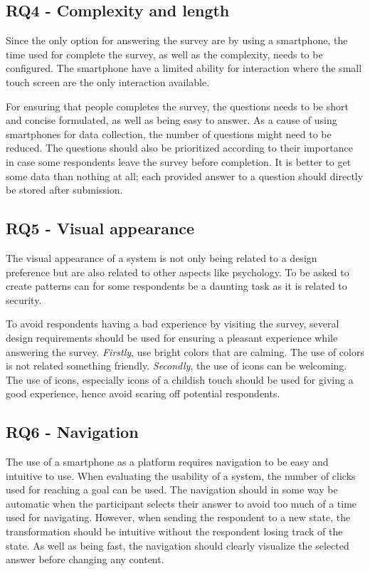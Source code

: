     \subsection*{RQ4 - Complexity and length}
    Since the only option for answering the survey are by using a smartphone, the time used for complete the survey, as well as the complexity, needs to be configured. The smartphone have a limited ability for interaction where the small touch screen are the only interaction available. 

    For ensuring that people completes the survey, the questions needs to be short and concise formulated, as well as being easy to answer. As a cause of using smartphones for data collection, the number of questions might need to be reduced. The questions should also be prioritized according to their importance in case some respondents leave the survey before completion. It is better to get some data than nothing at all; each provided answer to a question should directly be stored after submission. 

    \subsection*{RQ5 - Visual appearance}
    The visual appearance of a system is not only being related to a design preference but are also related to other aspects like psychology. To be asked to create patterns can for some respondents be a daunting task as it is related to security. 

    To avoid respondents having a bad experience by visiting the survey, several design requirements should be used for ensuring a pleasant experience while answering the survey. {\it Firstly}, use bright colors that are calming. The use of colors is not related something friendly. {\it Secondly}, the use of icons can be welcoming. The use of icons, especially icons of a childish touch should be used for giving a good experience, hence avoid scaring off potential respondents. 

    \subsection*{RQ6 - Navigation}
    The use of a smartphone as a platform requires navigation to be easy and intuitive to use. When evaluating the usability of a system, the number of clicks used for reaching a goal can be used. The navigation should in some way be automatic when the participant selects their answer to avoid too much of a time used for navigating. However, when sending the respondent to a new state, the transformation should be intuitive without the respondent losing track of the state. As well as being fast, the navigation should clearly visualize the selected answer before changing any content. 

